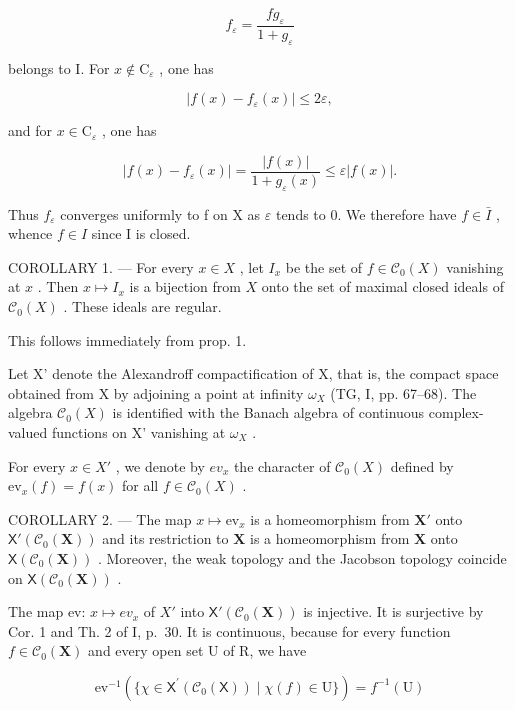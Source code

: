 \[
f _ {\varepsilon} = \frac {f g _ {\varepsilon}}{1 + g _ {\varepsilon}}
\]

belongs to I. For \(x \notin \mathrm{C}_{\varepsilon}\) , one has

\[
\left| f (x) - f _ {\varepsilon} (x) \right| \leqslant 2 \varepsilon ,
\]

and for \(x\in \mathrm{C}_{\varepsilon}\) , one has

\[
| f (x) - f _ {\varepsilon} (x) | = \frac {| f (x) |}{1 + g _ {\varepsilon} (x)} \leqslant \varepsilon | f (x) |.
\]

Thus \(f_{\varepsilon}\) converges uniformly to f on X as \(\varepsilon\) tends to 0. We therefore have \(f \in \bar{I}\) , whence \(f \in I\) since I is closed.

COROLLARY 1. --- For every \(x \in X\) , let \(I_x\) be the set of \(f \in \mathcal{C}_0(X)\) vanishing at \(x\) . Then \(x \mapsto I_x\) is a bijection from \(X\) onto the set of maximal closed ideals of \(\mathcal{C}_0(X)\) . These ideals are regular.

This follows immediately from prop. 1.

Let X' denote the Alexandroff compactification of X, that is, the compact space obtained from X by adjoining a point at infinity \(\omega_{X}\) (TG, I, pp. 67–68). The algebra \(\mathcal{C}_{0}(X)\) is identified with the Banach algebra of continuous complex-valued functions on X' vanishing at \(\omega_{X}\) .

For every \(x \in X'\) , we denote by \(ev_{x}\) the character of \(\mathcal{C}_{0}(X)\) defined by \(\mathrm{ev}_{x}(f) = f(x)\) for all \(f \in \mathcal{C}_{0}(X)\) .

COROLLARY 2. --- The map \(x \mapsto \mathrm{ev}_x\) is a homeomorphism from \(\mathbf{X}'\) onto \(\mathsf{X}'(\mathcal{C}_0(\mathbf{X}))\) and its restriction to \(\mathbf{X}\) is a homeomorphism from \(\mathbf{X}\) onto \(\mathsf{X}(\mathcal{C}_0(\mathbf{X}))\) . Moreover, the weak topology and the Jacobson topology coincide on \(\mathsf{X}(\mathcal{C}_0(\mathbf{X}))\) .

The map ev: \(x \mapsto ev_{x}\) of \(X'\) into \(\mathsf{X}'(\mathcal{C}_{0}(\mathbf{X}))\) is injective. It is surjective by Cor. 1 and Th. 2 of I, p.~30. It is continuous, because for every function \(f \in \mathcal{C}_{0}(\mathbf{X})\) and every open set U of R, we have

\[
\mathrm{ev} ^ {- 1} (\{\chi \in \mathsf {X} ^ {\prime} (\mathcal {C} _ {0} (\mathsf {X})) \mid \chi (f) \in \mathrm{U} \}) = f ^ {- 1} (\mathrm{U})
\]

